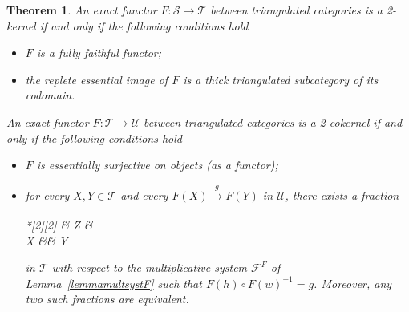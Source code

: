 \documentclass[11pt,reqno,a4paper]{amsart}
\newtheorem{theorem}{Theorem}[section]
\theoremstyle{definition}
\theoremstyle{remark}
\def\nameit#1{\textrm{#1}~}
\def\lemx{\nameit{Lemma}}
\newcommand{\T}{\mathcal{T}}
\renewcommand{\S}{\mathcal{S}}
\newcommand{\U}{\mathcal{U}}
\newcommand{\0}{\mathbf{0}}
\renewcommand{\1}{\mathbf{1}}
\def\:{\colon}
\newcommand{\aar}[2][]{\xrightarrow[#1]{#2}}
\begin{document}
\begin{theorem} \label{teorchar2ker2coker}
An exact functor $F\:\S \to \T$ between triangulated categories is a 2-kernel if and only if the following conditions hold
\begin{itemize}
\item [(FF)]$F$ is a fully faithful functor;
\item [(C1)] the replete essential image of $F$ is a thick triangulated subcategory of its codomain.
\end{itemize}
An exact functor $F\:\T \to \U$ between triangulated categories is a 2-cokernel if and only if the following conditions hold
\begin{itemize}
\item [(ES)]$F$ is essentially surjective on objects (as a functor);
\item [(C2)] for every $X,Y\in \T$ and every $F(X) \aar{g} F(Y)$ in $\U$, there exists a fraction \begin{cd}*[2][2] \& Z \& \\[-2ex]
	X \&\& Y
	\arrow["w"', from=1-2, to=2-1]
	\arrow["h", from=1-2, to=2-3]\end{cd} in $\T$ with respect to the multiplicative system $\mathcal{F}^F$ of \lemx\ref{lemmamultsystF} such that $F(h) \circ F(w)^{-1}=g$. Moreover, any two such fractions are equivalent.
\end{itemize}
\end{theorem}
\end{document}
